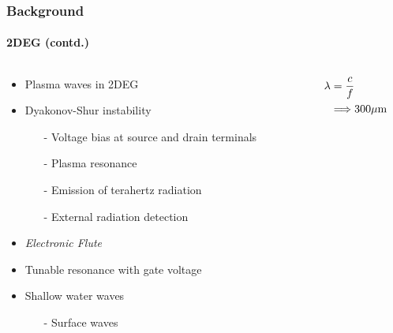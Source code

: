\documentclass[mathserif,16pt,xcolor=table]{beamer}
\begin{document}
\begin{frame}
  \frametitle{Background}
  \framesubtitle{2DEG (contd.)}

  \begin{columns} %
    \begin{column}{.5\textwidth}
      \begin{minipage}[T][.1\textheight][c]{\linewidth}
        \begin{itemize}
          \item Plasma waves in 2DEG
          \item Dyakonov-Shur instability
          \begin{itemize}
            \item[-]{Voltage bias at source and drain terminals}
            \item[-]{Plasma resonance}
            \item[-]{Emission of terahertz radiation}
            \item[-]{External radiation detection}
          \end{itemize}
          \item \emph{Electronic Flute}
          \item Tunable resonance with gate voltage
          \item Shallow water waves
          \begin{itemize}
            \item[-]{\color{red}Surface waves}
          \end{itemize}
        \end{itemize}
      \end{minipage}
    \end{column}
    \begin{column}{.5\textwidth}
      \begin{figure}
        \def\svgwidth{\linewidth}
        
      \end{figure}
      \begin{equation} \nonumber
        \begin{split}
          \lambda &= \frac{c}{f} \\
          & \Longrightarrow  300 \mu \mathrm{m}
        \end{split}
        \label{eq:disp_TE_two}
      \end{equation}
      \end{column}%
    \end{columns}
  \end{frame}
\end{document}
